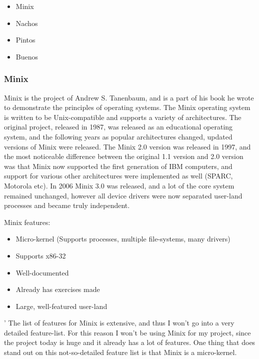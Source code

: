 \begin{itemize}
  \item Minix
  \item Nachos
  \item Pintos
  \item Buenos
\end{itemize}

\subsubsection{Minix\cite{MinixRef1}}

Minix is the project of Andrew S. Tanenbaum, and is a part of his book\cite{AndrewTanenbaum} he wrote to demonstrate the principles of operating systems. The Minix operating system is written to be Unix-compatible and supports a variety of architectures. The original project, released in 1987, was released as an educational operating system, and the following years as popular architectures changed, updated versions of Minix were released. The Minix 2.0 version was released in 1997, and the most noticeable difference between the original 1.1 version and 2.0 version was that Minix now supported the first generation of IBM computers, and support for various other architectures were implemented as well (SPARC, Motorola etc). In 2006 Minix 3.0 was released, and a lot of the core system remained unchanged, however all device drivers were now separated user-land processes and became truly independent.

Minix features\cite{MinixRef}:

\begin{itemize}
  \item Micro-kernel (Supports processes, multiple file-systems, many drivers)
  \item Supports x86-32
  \item Well-documented
  \item Already has exercises made
  \item Large, well-featured user-land
\end{itemize}
'
The list of features for Minix is extensive, and thus I won't go into a very detailed feature-list. For this reason I won't be using Minix for my project, since the project today is huge and it already has a lot of features. One thing that does stand out on this not-so-detailed feature list is that Minix is a micro-kernel.

